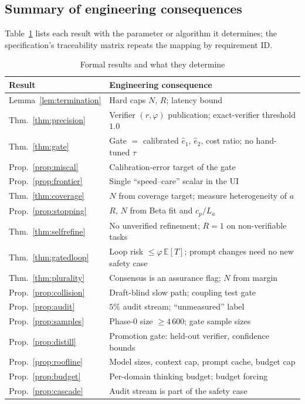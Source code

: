 \subsection{Summary of engineering consequences}
Table~\ref{tab:consequences} lists each result with the parameter or
algorithm it determines; the specification's traceability matrix repeats the
mapping by requirement ID.

\begin{table}[t]
\caption{Formal results and what they determine}
\label{tab:consequences}
\centering\small
\begin{tabular}{@{}p{2.2cm}p{5.8cm}@{}}
\toprule
Result & Engineering consequence \\
\midrule
Lemma~\ref{lem:termination} & Hard caps $N$, $R$; latency bound \\
Thm.~\ref{thm:precision} & Verifier $(r,\varphi)$ publication; exact-verifier threshold $1.0$ \\
Thm.~\ref{thm:gate} & Gate $=$ calibrated $\hat e_1$, $\hat e_2$, cost ratio; no hand-tuned $\tau$ \\
Prop.~\ref{prop:miscal} & Calibration-error target of the gate \\
Prop.~\ref{prop:frontier} & Single ``speed--care'' scalar in the UI \\
Thm.~\ref{thm:coverage} & $N$ from coverage target; measure heterogeneity of $a$ \\
Prop.~\ref{prop:stopping} & $R$, $N$ from Beta fit and $c_p/L_a$ \\
Thm.~\ref{thm:selfrefine} & No unverified refinement; $R=1$ on non-verifiable tasks \\
Thm.~\ref{thm:gatedloop} & Loop risk $\le\varphi\,\mathbb E[T]$; prompt changes need no new safety case \\
Thm.~\ref{thm:plurality} & Consensus is an assurance flag; $N$ from margin \\
Prop.~\ref{prop:collision} & Draft-blind slow path; coupling test gate \\
Prop.~\ref{prop:audit} & $5\%$ audit stream; ``unmeasured'' label \\
Prop.~\ref{prop:samples} & Phase-0 size $\ge4\,600$; gate sample sizes \\
Prop.~\ref{prop:distill} & Promotion gate: held-out verifier, confidence bounds \\
Prop.~\ref{prop:roofline} & Model sizes, context cap, prompt cache, budget cap \\
Prop.~\ref{prop:budget} & Per-domain thinking budget; budget forcing \\
Prop.~\ref{prop:cascade} & Audit stream is part of the safety case \\
\bottomrule
\end{tabular}
\end{table}
